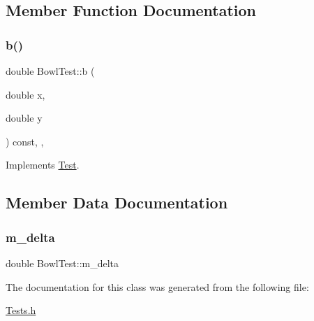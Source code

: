 \subsection{Member Function Documentation}
\mbox{\label{classBowlTest_af8bd1eab2a63aa1a836424a587424c7e}} 
\subsubsection{\texorpdfstring{b()}{b()}}
{\footnotesize\ttfamily double Bowl\+Test\+::b (\begin{DoxyParamCaption}\item[{double}]{x,  }\item[{double}]{y }\end{DoxyParamCaption}) const\hspace{0.3cm}{\ttfamily [inline]}, {\ttfamily [override]}, {\ttfamily [virtual]}}



Implements \hyperlink{classTest_a7bddd128de5558db4bae9a7542c8ae81}{Test}.



\subsection{Member Data Documentation}
\mbox{\label{classBowlTest_a17000e4b101eeefc34cf786f8973ad26}} 
\subsubsection{\texorpdfstring{m\+\_\+delta}{m\_delta}}
{\footnotesize\ttfamily double Bowl\+Test\+::m\+\_\+delta\hspace{0.3cm}{\ttfamily [protected]}}



The documentation for this class was generated from the following file\+:\begin{DoxyCompactItemize}
\item 
\hyperlink{Tests_8h}{Tests.\+h}\end{DoxyCompactItemize}
